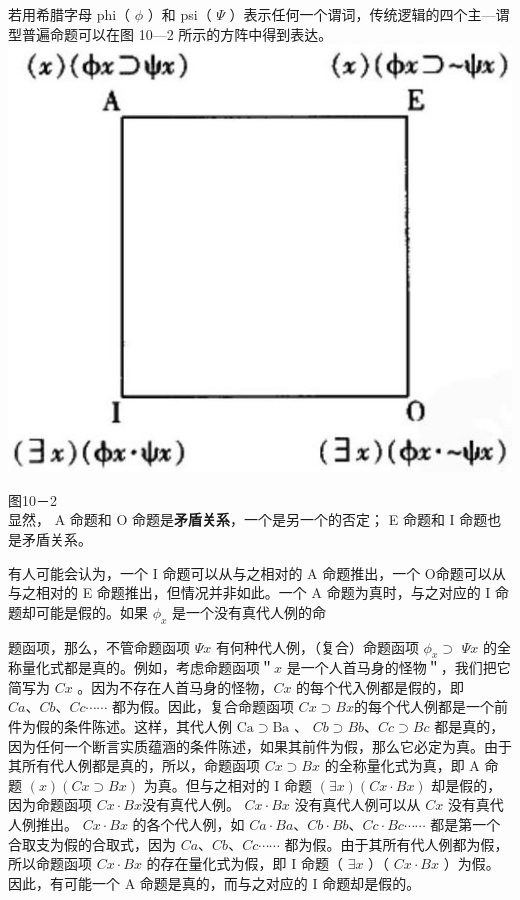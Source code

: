 若用希腊字母 phi（ $\phi$ ）和 psi（ $\Psi$ ）表示任何一个谓词，传统逻辑的四个主—谓型普遍命题可以在图 10—2 所示的方阵中得到表达。\\
\includegraphics[width=\textwidth]{images/2025_05_15_6a28331d5e7c993ad07ag-466.jpg}

图10－2\\
显然， A 命题和 O 命题是\textbf{矛盾关系}，一个是另一个的否定； E 命题和 I 命题也是矛盾关系。

有人可能会认为，一个 I 命题可以从与之相对的 A 命题推出，一个 O命题可以从与之相对的 E 命题推出，但情况并非如此。一个 A 命题为真时，与之对应的 I 命题却可能是假的。如果 $\phi_{x}$ 是一个没有真代人例的命

题函项，那么，不管命题函项 $\Psi x$ 有何种代人例，（复合）命题函项 $\phi_{x} \supset$ $\Psi x$ 的全称量化式都是真的。例如，考虑命题函项＂$x$ 是一个人首马身的怪物＂，我们把它简写为 $C x$ 。因为不存在人首马身的怪物，$C x$ 的每个代入例都是假的，即 $C a 、 C b 、 C c \cdots \cdots$ 都为假。因此，复合命题函项 $C x \supset B x$的每个代人例都是一个前件为假的条件陈述。这样，其代人例 $\mathrm{Ca} \supset \mathrm{Ba}$ 、 $C b \supset B b 、 C c \supset B c$ 都是真的，因为任何一个断言实质蕴涵的条件陈述，如果其前件为假，那么它必定为真。由于其所有代人例都是真的，所以，命题函项 $C x \supset B x$ 的全称量化式为真，即 A 命题 $(x)(C x \supset B x)$ 为真。但与之相对的 I 命题 $(\exists x)(C x \cdot B x)$ 却是假的，因为命题函项 $C x \cdot B x$没有真代人例。 $C x \cdot B x$ 没有真代人例可以从 $C x$ 没有真代人例推出。 $C x \cdot B x$ 的各个代人例，如 $C a \cdot B a 、 C b \cdot B b 、 C c \cdot B c \cdots \cdots$ 都是第一个合取支为假的合取式，因为 $C a 、 C b 、 C c \cdots \cdots$ 都为假。由于其所有代人例都为假，所以命题函项 $C x \cdot B x$ 的存在量化式为假，即 I 命题（ $\exists x$ ）（ $C x \cdot B x$ ）为假。因此，有可能一个 A 命题是真的，而与之对应的 I 命题却是假的。

